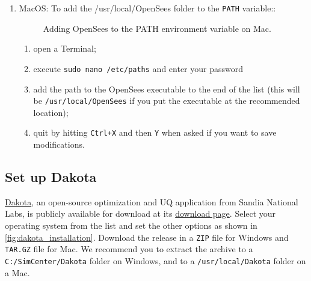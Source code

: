 \begin{enumerate}
\item MacOS: To add the /usr/local/OpenSees folder to the \texttt{PATH} variable::

\begin{figure}[!htbp]
  \caption{Adding OpenSees to the PATH environment variable on Mac.}
  \label{fig:add_env_path_Mac}
\end{figure}

\begin{enumerate}
    \item open a Terminal;
    \item execute \texttt{sudo nano /etc/paths} and enter your password
    \item add the path to the OpenSees executable to the end of the list (this will be \texttt{/usr/local/OpenSees} if you put the executable at the recommended location);
    \item quit by hitting \texttt{Ctrl+X} and then \texttt{Y} when asked if you want to save modifications.
\end{enumerate}

\end{enumerate}



\subsection{Set up Dakota}

\href{http://dakota.sandia.gov}{Dakota}, an open-source  optimization and UQ application from Sandia National Labs, is publicly available for download at its \href{http://dakota.sandia.gov/download.html}{download page}. Select your operating system from the list and set the other options as shown in  \autoref{fig:dakota_installation}. Download the release in a \texttt{ZIP} file for Windows and \texttt{TAR.GZ} file for Mac. We recommend you to extract the archive to a \texttt{C:/SimCenter/Dakota} folder on Windows, and to a \texttt{/usr/local/Dakota} folder on a Mac.

